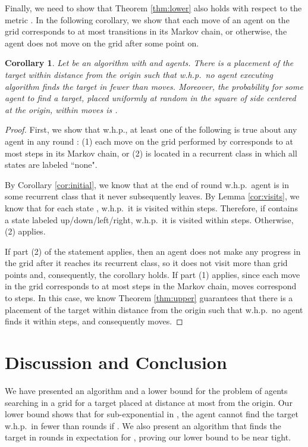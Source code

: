 \documentclass[11pt]{article}
\newtheorem{corollary}[theorem]{Corollary}
\begin{document}
Finally, we need to show that Theorem \ref{thm:lower} also holds with respect to the metric . In the following corollary, we show that each move of an agent on the grid corresponds to at most  transitions in its Markov chain, or otherwise, the agent does not move on the grid after some point on. 

\begin{corollary}
\label{cor:moves}
	Let  be an algorithm with  and  agents. There is a placement of the target within distance  from the origin such that w.h.p.\ no agent executing algorithm  finds the target in fewer than  moves.
	Moreover, the probability for some agent to find a target, placed uniformly at random in the square of side  centered at the origin, within  moves is .
\end{corollary}
\begin{proof}
	First, we show that w.h.p., at least one of the following is true about any agent  in any round : (1) each move on the grid performed by  corresponds to at most  steps in its Markov chain, or (2)  is located in a recurrent class in which all states are labeled ``none".
	
	By Corollary \ref{cor:initial}, we know that at the end of round  w.h.p.\ agent  is in some recurrent class  that it never subsequently leaves. By Lemma \ref{cor:visits}, we know that for each state , w.h.p.\ it is visited within  steps. Therefore, if  contains a state labeled up/down/left/right, w.h.p.\ it is visited within  steps. Otherwise, (2) applies. 
	
	If part (2) of the statement applies, then an agent does not make any progress in the grid after it reaches its recurrent class, so it does not visit more than  grid points and, consequently, the corollary holds. If part (1) applies, since each move in the grid corresponds to at most  steps in the Markov chain,  moves correspond to  steps. In this case, we know Theorem \ref{thm:upper} guarantees that there is a placement of the target within distance  from the origin such that w.h.p.\ no agent finds it within  steps, and consequently  moves.
\end{proof}



\section{Discussion and Conclusion}
\label{sec:discussion}

We have presented an algorithm and a lower bound for the problem of  agents searching in a grid for a target placed at distance at most  from the origin. Our lower bound shows that for  sub-exponential in , the agent cannot find the target w.h.p.\ in fewer than  rounds if . We also present an algorithm that finds the target in  rounds in expectation for , proving our lower bound to be near tight.
\end{document}
